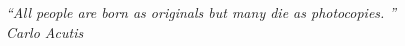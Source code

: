 \begin{epigrafe}
    \vspace*{\fill}
	\begin{flushright}
		\textit{``All people are born as originals but many die as photocopies. ''\\
		Carlo Acutis}
	\end{flushright}
\end{epigrafe}
